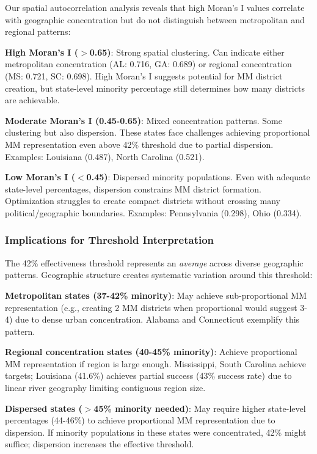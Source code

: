 Our spatial autocorrelation analysis reveals that high Moran's I values correlate with geographic concentration but do not distinguish between metropolitan and regional patterns:

\textbf{High Moran's I ($>$0.65)}: Strong spatial clustering. Can indicate either metropolitan concentration (AL: 0.716, GA: 0.689) or regional concentration (MS: 0.721, SC: 0.698). High Moran's I suggests potential for MM district creation, but state-level minority percentage still determines how many districts are achievable.

\textbf{Moderate Moran's I (0.45-0.65)}: Mixed concentration patterns. Some clustering but also dispersion. These states face challenges achieving proportional MM representation even above 42\% threshold due to partial dispersion. Examples: Louisiana (0.487), North Carolina (0.521).

\textbf{Low Moran's I ($<$0.45)}: Dispersed minority populations. Even with adequate state-level percentages, dispersion constrains MM district formation. Optimization struggles to create compact districts without crossing many political/geographic boundaries. Examples: Pennsylvania (0.298), Ohio (0.334).

\subsubsection{Implications for Threshold Interpretation}

The 42\% effectiveness threshold represents an \textit{average} across diverse geographic patterns. Geographic structure creates systematic variation around this threshold:

\textbf{Metropolitan states (37-42\% minority)}: May achieve sub-proportional MM representation (e.g., creating 2 MM districts when proportional would suggest 3-4) due to dense urban concentration. Alabama and Connecticut exemplify this pattern.

\textbf{Regional concentration states (40-45\% minority)}: Achieve proportional MM representation if region is large enough. Mississippi, South Carolina achieve targets; Louisiana (41.6\%) achieves partial success (43\% success rate) due to linear river geography limiting contiguous region size.

\textbf{Dispersed states ($>$45\% minority needed)}: May require higher state-level percentages (44-46\%) to achieve proportional MM representation due to dispersion. If minority populations in these states were concentrated, 42\% might suffice; dispersion increases the effective threshold.

